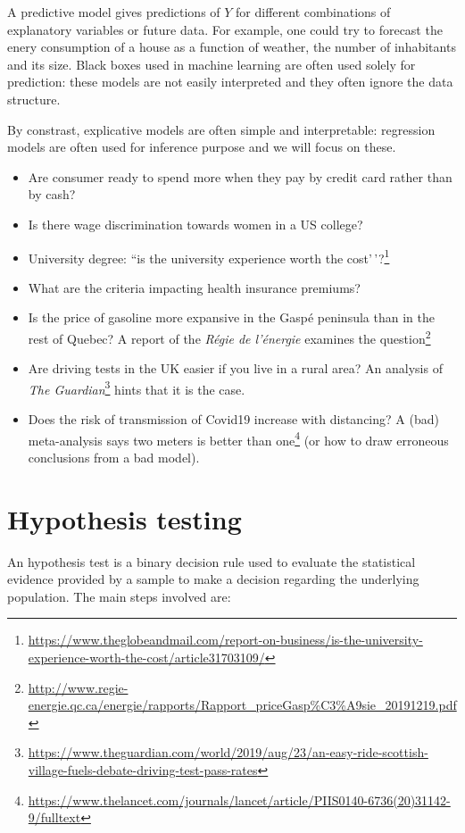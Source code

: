\documentclass[
  11pt,
  letterpaper,
]{book}
\providecommand{\tightlist}{%
  \setlength{\itemsep}{0pt}\setlength{\parskip}{0pt}}
\renewcommand{\href}[2]{#2\footnote{\url{#1}}}
\theoremstyle{definition}
\theoremstyle{definition}
\theoremstyle{definition}
\theoremstyle{remark}
\begin{document}
A predictive model gives predictions of \(Y\) for different combinations of explanatory variables or future data. For example, one could try to forecast the enery consumption of a house as a function of weather, the number of inhabitants and its size. Black boxes used in machine learning are often used solely for prediction: these models are not easily interpreted and they often ignore the data structure.

By constrast, explicative models are often simple and interpretable: regression models are often used for inference purpose and we will focus on these.

\begin{itemize}
\tightlist
\item
  Are consumer ready to spend more when they pay by credit card rather than by cash?
\item
  Is there wage discrimination towards women in a US college?
\item
  University degree: \href{https://www.theglobeandmail.com/report-on-business/is-the-university-experience-worth-the-cost/article31703109/}{``is the university experience worth the cost'\,'?}
\item
  What are the criteria impacting health insurance premiums?
\item
  Is the price of gasoline more expansive in the Gaspé peninsula than in the rest of Quebec? \href{http://www.regie-energie.qc.ca/energie/rapports/Rapport_priceGasp\%C3\%A9sie_20191219.pdf}{A report of the \emph{Régie de l'énergie} examines the question}
\item
  Are driving tests in the UK easier if you live in a rural area? \href{https://www.theguardian.com/world/2019/aug/23/an-easy-ride-scottish-village-fuels-debate-driving-test-pass-rates}{An analysis of \emph{The Guardian}} hints that it is the case.
\item
  Does the risk of transmission of Covid19 increase with distancing? \href{https://www.thelancet.com/journals/lancet/article/PIIS0140-6736(20)31142-9/fulltext}{A (bad) meta-analysis says two meters is better than one} (or how to draw erroneous conclusions from a bad model).
\end{itemize}

\hypertarget{tests}{%
\section{Hypothesis testing}\label{tests}}

An hypothesis test is a binary decision rule used to evaluate the statistical evidence provided by a sample to make a decision regarding the underlying population. The main steps involved are:
\end{document}
